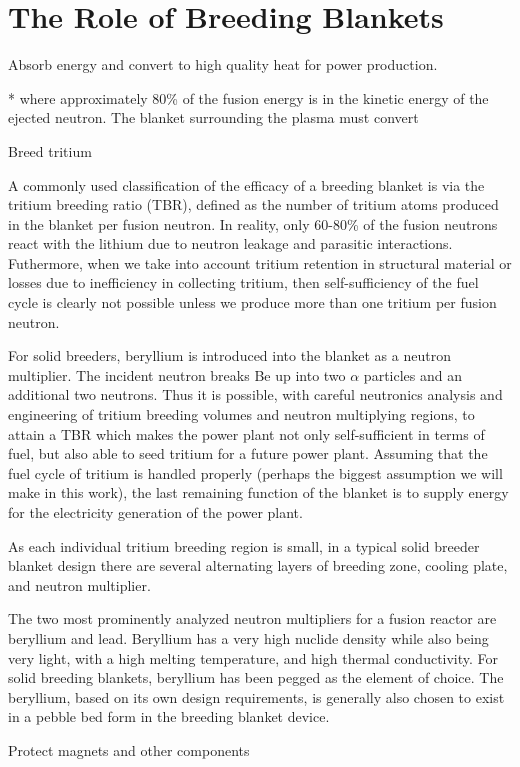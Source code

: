 \section{The Role of Breeding Blankets}
Absorb energy and convert to high quality heat for power production.

* where approximately 80\% of the fusion energy is in the kinetic energy of the ejected neutron. The blanket surrounding the plasma must convert

Breed tritium

A commonly used classification of the efficacy of a breeding blanket is via the tritium breeding ratio (TBR), defined as the number of tritium atoms produced in the blanket per fusion neutron. In reality, only 60-80\% of the fusion neutrons react with the lithium due to neutron leakage and parasitic interactions. Futhermore, when we take into account tritium retention in structural material or losses due to inefficiency in collecting tritium, then self-sufficiency of the fuel cycle is clearly not possible unless we produce more than one tritium per fusion neutron. 

For solid breeders, beryllium is introduced into the blanket as a neutron multiplier. The incident neutron breaks Be up into two $\alpha$ particles and an additional two neutrons. Thus it is possible, with careful neutronics analysis and engineering of tritium breeding volumes and neutron multiplying regions, to attain a TBR which makes the power plant not only self-sufficient in terms of fuel, but also able to seed tritium for a future power plant. Assuming that the fuel cycle of tritium is handled properly (perhaps the biggest assumption we will make in this work), the last remaining function of the blanket is to supply energy for the electricity generation of the power plant. 

As each individual tritium breeding region is small, in a typical solid breeder blanket design there are several alternating layers of breeding zone, cooling plate, and neutron multiplier. 

The two most prominently analyzed neutron multipliers for a fusion reactor are beryllium and lead. Beryllium has a very high nuclide density while also being very light, with a high melting temperature, and high thermal conductivity. For solid breeding blankets, beryllium has been pegged as the element of choice. The beryllium, based on its own design requirements, is generally also chosen to exist in a pebble bed form in the breeding blanket device.





Protect magnets and other components